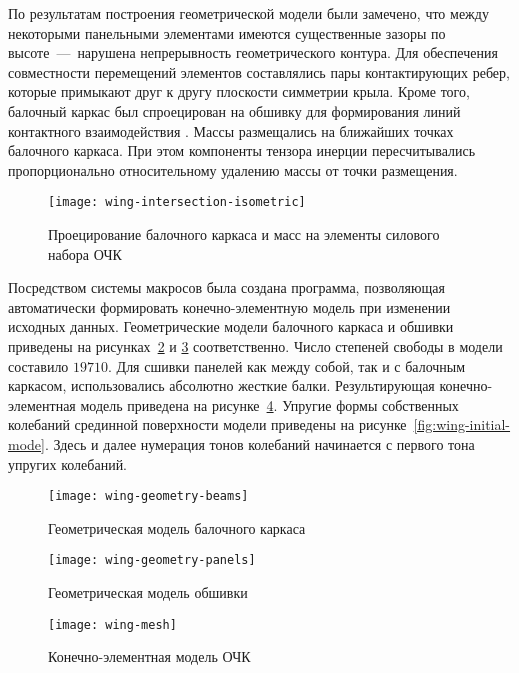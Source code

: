 По результатам построения геометрической модели были замечено, что между некоторыми панельными элементами имеются существенные зазоры по высоте~---~нарушена непрерывность геометрического контура. Для обеспечения совместности перемещений элементов составлялись пары контактирующих ребер, которые примыкают друг к другу плоскости симметрии крыла. Кроме того, балочный каркас был спроецирован на обшивку для формирования линий контактного взаимодействия . Массы размещались на ближайших точках балочного каркаса. При этом компоненты тензора инерции пересчитывались пропорционально относительному удалению массы от точки размещения. 

\begin{figure}[!htb]
	\centerfloat
	\texttt{[image: wing-intersection-isometric]}
	\caption{Проецирование балочного каркаса и масс на элементы силового набора ОЧК} \label{wing-intersection-isometric}
\end{figure}

Посредством системы макросов  была создана программа, позволяющая автоматически формировать конечно-элементную модель при изменении исходных данных. Геометрические модели балочного каркаса и обшивки приведены на рисунках~\ref{fig:wing-geometry-beams} и \ref{fig:wing-geometry-panels} соответственно. Число степеней свободы в модели составило $ 19710 $. Для сшивки панелей как между собой, так и с балочным каркасом, использовались абсолютно жесткие балки. Результирующая конечно-элементная модель приведена на рисунке~\ref{fig:wing-mesh}. Упругие формы собственных колебаний срединной поверхности модели приведены на рисунке~\ref{fig:wing-initial-mode}. Здесь и далее нумерация тонов колебаний начинается с первого тона упругих колебаний. 

\begin{figure}[!htb]
	\centerfloat
	\texttt{[image: wing-geometry-beams]}
	\caption{Геометрическая модель балочного каркаса}\label{fig:wing-geometry-beams}
\end{figure}

\begin{figure}[!htb]
	\centerfloat
	\texttt{[image: wing-geometry-panels]}
	\caption{Геометрическая модель обшивки}\label{fig:wing-geometry-panels}
\end{figure}

\begin{figure}[H]
	\centerfloat
	\texttt{[image: wing-mesh]}
	\caption{Конечно-элементная модель ОЧК} \label{fig:wing-mesh}
\end{figure}

